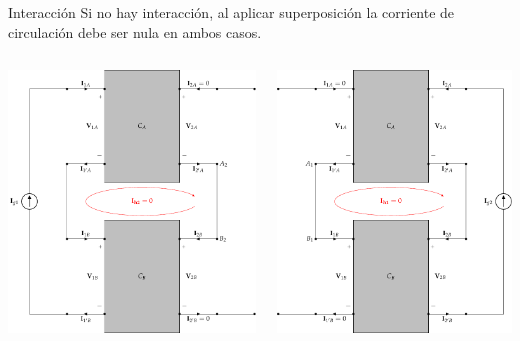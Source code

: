 \documentclass[xcolor={usenames,svgnames,dvipsnames}]{beamer}
\begin{document}
\begin{frame}[label={sec:org0818282},plain]{Interacción}
Si no hay interacción, al aplicar superposición la corriente de circulación debe ser nula \alert{en ambos casos}.
\begin{columns}
\begin{column}{0.65\columnwidth}
\begin{center}
\includegraphics[width=.9\linewidth]{figs/serie-serie-superposicion-entrada.pdf}
\end{center}
\end{column}
\begin{column}{0.65\columnwidth}
\begin{center}
\includegraphics[width=.9\linewidth]{figs/serie-serie-superposicion-salida.pdf}

\end{center}
\end{column}
\end{columns}
\end{frame}
\end{document}
